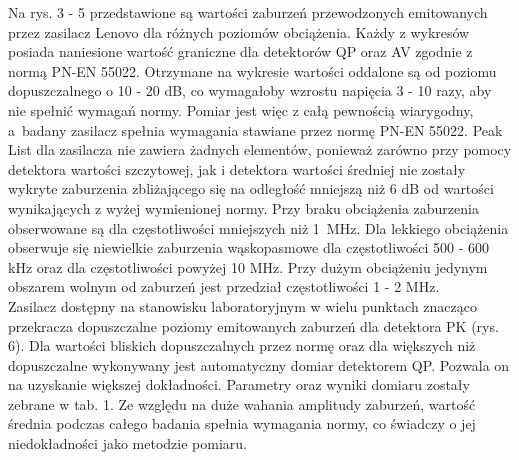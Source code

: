 \documentclass[12pt, a4paper, oneside]{article}
\begin{document}
Na rys. 3 - 5 przedstawione są wartości zaburzeń przewodzonych emitowanych przez zasilacz Lenovo dla różnych poziomów obciążenia. Każdy z wykresów posiada naniesione wartość graniczne dla detektorów QP oraz AV zgodnie z normą PN-EN 55022. Otrzymane na wykresie wartości oddalone są od poziomu dopuszczalnego o 10 - 20 dB, co wymagałoby wzrostu napięcia 3 - 10 razy, aby nie spełnić wymagań normy. Pomiar jest więc z całą pewnością wiarygodny, a~badany zasilacz spełnia wymagania stawiane przez normę PN-EN 55022. Peak List dla zasilacza nie zawiera żadnych elementów, ponieważ zarówno  przy pomocy detektora wartości szczytowej, jak i detektora wartości średniej nie zostały wykryte zaburzenia zbliżającego się na odległość mniejszą niż 6 dB od wartości wynikających z wyżej wymienionej normy. Przy braku obciążenia zaburzenia obserwowane są dla częstotliwości mniejszych niż 1~MHz. Dla lekkiego obciążenia obserwuje się niewielkie zaburzenia wąskopasmowe dla częstotliwości 500 - 600 kHz oraz dla częstotliwości powyżej 10 MHz. Przy dużym obciążeniu jedynym obszarem wolnym od zaburzeń jest przedział częstotliwości 1 - 2 MHz.\\
\indent Zasilacz dostępny na stanowisku laboratoryjnym w wielu punktach znacząco przekracza dopuszczalne poziomy emitowanych zaburzeń dla detektora PK (rys. 6). Dla wartości bliskich dopuszczalnych przez normę oraz dla większych niż dopuszczalne wykonywany jest automatyczny domiar detektorem QP. Pozwala on na uzyskanie większej dokładności. Parametry oraz wyniki domiaru zostały zebrane w tab. 1. Ze względu na duże wahania amplitudy zaburzeń, wartość średnia podczas całego badania spełnia wymagania normy, co świadczy o jej niedokładności jako metodzie pomiaru.
\end{document}
